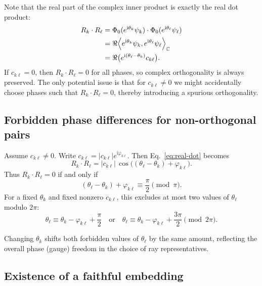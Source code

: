 \documentclass[%
  reprint,
  superscriptaddress,
  amsmath,amssymb,
  pra,
  floatfix,
  longbibliography
]{revtex4-2}
\begin{document}
Note that the real part of the complex inner product is exactly the real dot
product:
\begin{align}
  R_k\cdot R_\ell
  &= \Phi_0(e^{\mathrm{i}\theta_k}\psi_k)\cdot \Phi_0(e^{\mathrm{i}\theta_\ell}\psi_\ell) \nonumber\\
  &= \Re\Bigl\langle e^{\mathrm{i}\theta_k}\psi_k, e^{\mathrm{i}\theta_\ell}\psi_\ell\Bigr\rangle_{\mathbb{C}} \nonumber\\
  &= \Re\bigl( e^{\mathrm{i}(\theta_\ell-\theta_k)} c_{k\ell}\bigr).
  \label{eq:real-dot}
\end{align}
If $c_{k\ell}=0$, then $R_k\cdot R_\ell=0$ for all phases, so complex orthogonality is always preserved. The only potential issue is that for $c_{k\ell}\neq 0$ we might accidentally choose phases such that $R_k\cdot R_\ell=0$, thereby introducing a spurious orthogonality.

\subsection{Forbidden phase differences for non-orthogonal pairs}

Assume $c_{k\ell}\neq 0$. Write $c_{k\ell}=|c_{k\ell}|e^{\mathrm{i}\varphi_{k\ell}}$. Then Eq.~\eqref{eq:real-dot} becomes
\begin{equation}
  R_k\cdot R_\ell
  = |c_{k\ell}|\,\cos\bigl( (\theta_\ell-\theta_k)+\varphi_{k\ell}\bigr).
\end{equation}
Thus $R_k\cdot R_\ell=0$ if and only if
\begin{equation}
  (\theta_\ell-\theta_k)+\varphi_{k\ell} \equiv \frac{\pi}{2}\pmod{\pi}.
\end{equation}
For a fixed $\theta_k$ and fixed nonzero $c_{k\ell}$, this excludes at most two values of $\theta_\ell$ modulo $2\pi$:
\begin{equation}
  \theta_\ell \equiv \theta_k -\varphi_{k\ell} + \frac{\pi}{2}
  \quad\text{or}\quad
  \theta_\ell \equiv \theta_k -\varphi_{k\ell} + \frac{3\pi}{2}
  \pmod{2\pi}.
\label{2025-rvc-pa}
\end{equation}

Changing $\theta_k$ shifts both forbidden values of $\theta_\ell$ by the same amount, reflecting the overall phase (gauge) freedom in the choice of ray representatives.


\subsection{Existence of a faithful embedding}
\end{document}
